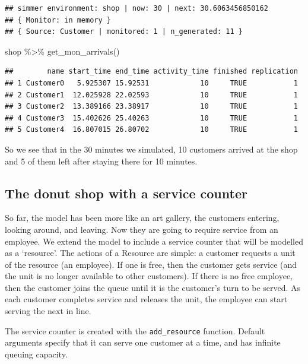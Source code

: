 \documentclass[
]{book}
\newenvironment{Shaded}{\begin{snugshade}}{\end{snugshade}}
\newcommand{\FunctionTok}[1]{\textcolor[rgb]{0.00,0.00,0.00}{#1}}
\newcommand{\NormalTok}[1]{#1}
\newcommand{\SpecialCharTok}[1]{\textcolor[rgb]{0.00,0.00,0.00}{#1}}
\begin{document}
\begin{verbatim}
## simmer environment: shop | now: 30 | next: 30.6063456850162
## { Monitor: in memory }
## { Source: Customer | monitored: 1 | n_generated: 11 }
\end{verbatim}

\begin{Shaded}
\begin{Highlighting}[]
\NormalTok{shop }\SpecialCharTok{\%\textgreater{}\%} \FunctionTok{get\_mon\_arrivals}\NormalTok{()}
\end{Highlighting}
\end{Shaded}

\begin{verbatim}
##        name start_time end_time activity_time finished replication
## 1 Customer0   5.925307 15.92531            10     TRUE           1
## 2 Customer1  12.025928 22.02593            10     TRUE           1
## 3 Customer2  13.389166 23.38917            10     TRUE           1
## 4 Customer3  15.402626 25.40263            10     TRUE           1
## 5 Customer4  16.807015 26.80702            10     TRUE           1
\end{verbatim}

So we see that in the 30 minutes we simulated, 10 customers arrived at the shop and 5 of them left after staying there for 10 minutes.

\hypertarget{the-donut-shop-with-a-service-counter}{%
\subsection{The donut shop with a service counter}\label{the-donut-shop-with-a-service-counter}}

So far, the model has been more like an art gallery, the customers entering, looking around, and leaving. Now they are going to require service from an employee. We extend the model to include a service counter that will be modelled as a `resource'. The actions of a Resource are simple: a customer requests a unit of the resource (an employee). If one is free, then the customer gets service (and the unit is no longer available to other customers). If there is no free employee, then the customer joins the queue until it is the customer's turn to be served. As each customer completes service and releases the unit, the employee can start serving the next in line.

The service counter is created with the \texttt{add\_resource} function. Default arguments specify that it can serve one customer at a time, and has infinite queuing capacity.
\end{document}
